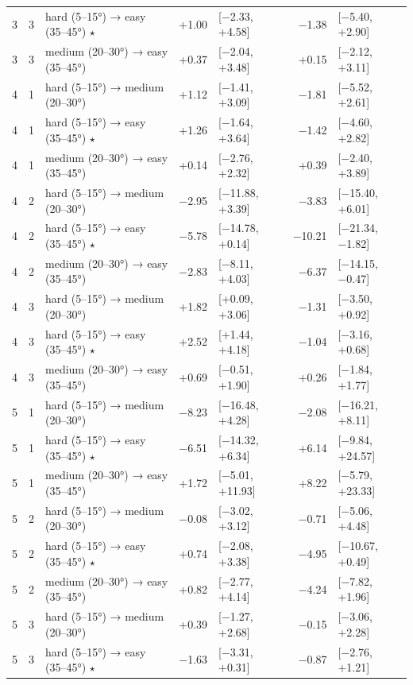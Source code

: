 \begin{table}[htbp]
\begin{tabular}{rllrlrl}
    3 & 3 & hard (5–15°) → easy (35–45°) $\star$ & +1.00 & [−2.33, +4.58] & −1.38 & [−5.40, +2.90] \\
    3 & 3 & medium (20–30°) → easy (35–45°) & +0.37 & [−2.04, +3.48] & +0.15 & [−2.12, +3.11] \\
    4 & 1 & hard (5–15°) → medium (20–30°) & +1.12 & [−1.41, +3.09] & −1.81 & [−5.52, +2.61] \\
    4 & 1 & hard (5–15°) → easy (35–45°) $\star$ & +1.26 & [−1.64, +3.64] & −1.42 & [−4.60, +2.82] \\
    4 & 1 & medium (20–30°) → easy (35–45°) & +0.14 & [−2.76, +2.32] & +0.39 & [−2.40, +3.89] \\
    4 & 2 & hard (5–15°) → medium (20–30°) & −2.95 & [−11.88, +3.39] & −3.83 & [−15.40, +6.01] \\
    4 & 2 & hard (5–15°) → easy (35–45°) $\star$ & −5.78 & [−14.78, +0.14] & −10.21 & [−21.34, −1.82] \\
    4 & 2 & medium (20–30°) → easy (35–45°) & −2.83 & [−8.11, +4.03] & −6.37 & [−14.15, −0.47] \\
    4 & 3 & hard (5–15°) → medium (20–30°) & +1.82 & [+0.09, +3.06] & −1.31 & [−3.50, +0.92] \\
    4 & 3 & hard (5–15°) → easy (35–45°) $\star$ & +2.52 & [+1.44, +4.18] & −1.04 & [−3.16, +0.68] \\
    4 & 3 & medium (20–30°) → easy (35–45°) & +0.69 & [−0.51, +1.90] & +0.26 & [−1.84, +1.77] \\
    5 & 1 & hard (5–15°) → medium (20–30°) & −8.23 & [−16.48, +4.28] & −2.08 & [−16.21, +8.11] \\
    5 & 1 & hard (5–15°) → easy (35–45°) $\star$ & −6.51 & [−14.32, +6.34] & +6.14 & [−9.84, +24.57] \\
    5 & 1 & medium (20–30°) → easy (35–45°) & +1.72 & [−5.01, +11.93] & +8.22 & [−5.79, +23.33] \\
    5 & 2 & hard (5–15°) → medium (20–30°) & −0.08 & [−3.02, +3.12] & −0.71 & [−5.06, +4.48] \\
    5 & 2 & hard (5–15°) → easy (35–45°) $\star$ & +0.74 & [−2.08, +3.38] & −4.95 & [−10.67, +0.49] \\
    5 & 2 & medium (20–30°) → easy (35–45°) & +0.82 & [−2.77, +4.14] & −4.24 & [−7.82, +1.96] \\
    5 & 3 & hard (5–15°) → medium (20–30°) & +0.39 & [−1.27, +2.68] & −0.15 & [−3.06, +2.28] \\
    5 & 3 & hard (5–15°) → easy (35–45°) $\star$ & −1.63 & [−3.31, +0.31] & −0.87 & [−2.76, +1.21] \\

\end{tabular}
\end{table}

